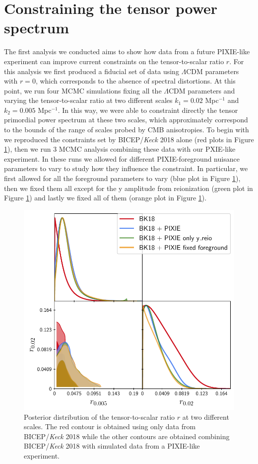 \section{Constraining the tensor power spectrum}
The first analysis we conducted aims to show how data from a future PIXIE-like experiment can improve current constraints on the tensor-to-scalar ratio $r$. For this analysis we first produced a fiducial set of data using $\Lambda$CDM parameters with $r=0$, which corresponds to the absence of spectral distortions. At this point, we run four MCMC simulations fixing all the $\Lambda$CDM parameters and varying the tensor-to-scalar ratio at two different scales $k_1=0.02$ Mpc$^{-1}$ and $k_2=0.005$ Mpc$^{-1}$. In this way, we were able to constraint directly the tensor primordial power spectrum at these two scales, which approximately correspond to the bounds of the range of scales probed by CMB anisotropies. To begin with we reproduced the constraints set by BICEP/\textit{Keck} 2018 alone (red plots in Figure \ref{fig:r_const}), then we run 3 MCMC analysis combining these data with our PXIE-like experiment. In these runs we allowed for different PIXIE-foreground nuisance parameters to vary to study how they influence the constraint. In particular, we first allowed for all the foreground parameters to vary (blue plot in Figure \ref{fig:r_const}), then we fixed them all except for the y amplitude from reionization (green plot in Figure \ref{fig:r_const}) and lastly we fixed all of them (orange plot in Figure \ref{fig:r_const}). 
\begin{figure}[t]
        \centering
        \includegraphics[width=.8\textwidth]{Constraints/BKPIXIE.pdf}
        \caption{Posterior distribution of the tensor-to-scalar ratio $r$ at two different scales. The red contour is obtained using only data from BICEP/\textit{Keck} 2018 \cite{Ade_2021} while the other contours are obtained combining BICEP/\textit{Keck} 2018 with simulated data from a PIXIE-like experiment.}
        \label{fig:r_const}        
    \end{figure}
